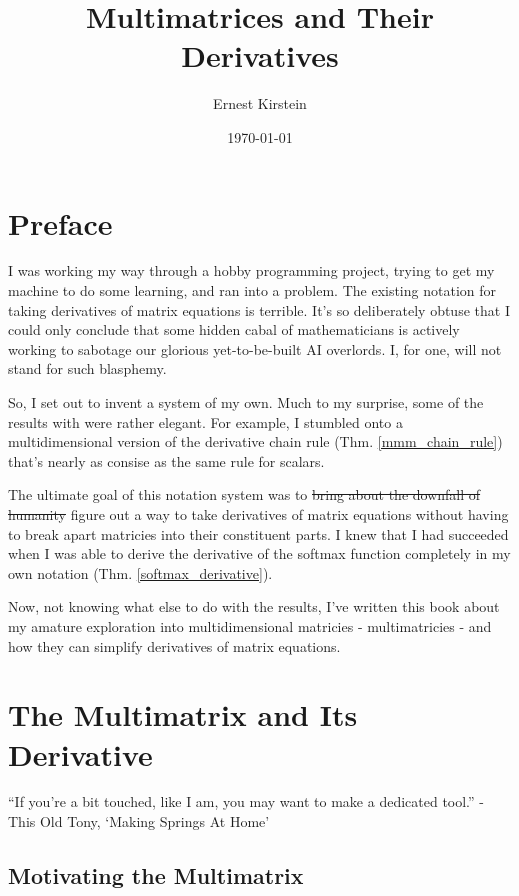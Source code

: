 \documentclass[12pt]{book}
\title{Multimatrices and Their Derivatives}
\author{Ernest Kirstein}
\date{\today}
\theoremstyle{definition}
\theoremstyle{plain}
\theoremstyle{ppart}
\theoremstyle{case}
\theoremstyle{solution}
\begin{document}
\maketitle

\chapter*{Preface}
I was working my way through a hobby programming project, trying to get my
machine to do some learning, and ran into a problem.
The existing notation for taking derivatives of matrix equations is terrible.
It's so deliberately obtuse that I could only conclude that some hidden cabal of
mathematicians is actively working to sabotage our glorious yet-to-be-built
AI overlords. I, for one, will not stand for such blasphemy.

So, I set out to invent a system of my own. Much to my surprise, some of the
results with were rather elegant. For example, I stumbled onto a
multidimensional version of the derivative chain rule (Thm. \ref{mmm_chain_rule})
that's nearly as consise as the same rule for scalars.

The ultimate goal of this notation system was to \sout{bring about the downfall
of humanity} figure out a way to take derivatives
of matrix equations without having to break apart matricies into their constituent
parts. I knew that I had succeeded when I was able to derive the derivative of the
softmax function completely in my own notation (Thm. \ref{softmax_derivative}).

Now, not knowing what else to do with the results, I've written this book
about my amature exploration into multidimensional matricies -
multimatricies - and how they can simplify derivatives of matrix equations.

\tableofcontents

\chapter{The Multimatrix and Its Derivative}

\begin{displayquote}
``If you're a bit touched, like I am, you may want to make a dedicated tool.'' -
This Old Tony, `Making Springs At Home'
\end{displayquote}

\section{Motivating the Multimatrix}
\end{document}
